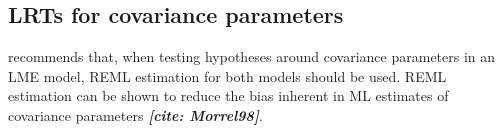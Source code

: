 \documentclass[12pt, a4paper]{article}
\begin{document}
	
	
	
	





\subsection{LRTs for covariance parameters}
\citet{west} recommends that, when testing hypotheses around covariance parameters in an LME model, REML estimation for both models should be used. REML estimation can be shown to reduce the bias inherent in ML estimates of covariance parameters\textbf{ \textit{[cite: Morrel98]}}.






\end{document}

